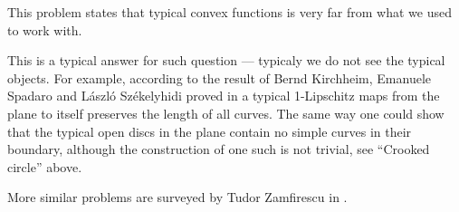 This problem states that typical convex functions is very far from what we used to work with.

This is a typical answer for such question --- typicaly we do not see the typical objects.
For example, according to the result of 
Bernd Kirchheim, 
Emanuele Spadaro  
and 
L{\'a}szl{\'o} Sz{\'e}kelyhidi proved in \cite{KSS}
a typical 1-Lipschitz maps from the plane to itself preserves the length of all curves.
The same way one could show that the typical open discs in the plane contain no simple curves in their boundary, 
although the construction of one such is not trivial, 
see ``Crooked circle'' above.

More similar problems are surveyed by Tudor Zamfirescu in \cite{zamfirescu}.







